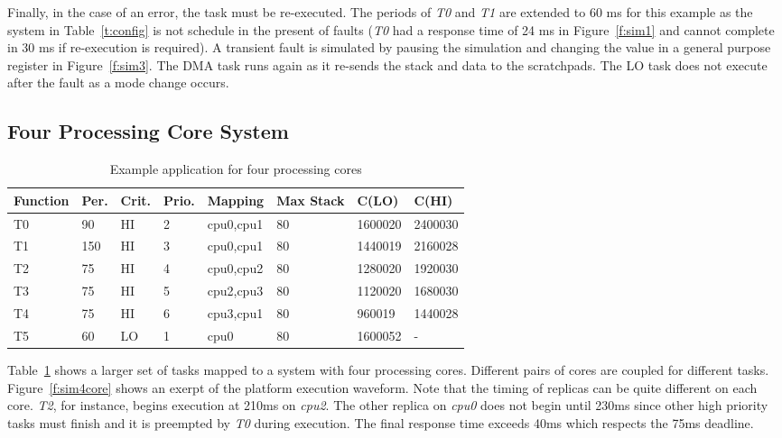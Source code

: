 	Finally, in the case of an error, the task must be re-executed. 
	The periods of \emph{T0} and \emph{T1} are extended to 60 ms for this example as the system in Table~\ref{t:config} is not schedule in the present of faults (\emph{T0} had a response time of 24 ms in Figure~\ref{f:sim1} and cannot complete in 30 ms if re-execution is required).
	A transient fault is simulated by pausing the simulation and changing the value in a general purpose register in Figure~\ref{f:sim3}. 
	The DMA task runs again as it re-sends the stack and data to the scratchpads.
	The LO task does not execute after the fault as a mode change occurs.
	
		 

\subsection{Four Processing Core System}

\begin{table}[h]
\caption{Example application for four processing cores}
\centering

	\begin{tabular}{@{}llllllll@{}}
	Function & Per. & Crit. & Prio. & Mapping & Max Stack & C(LO) & C(HI) 	 \\
	
	\toprule
	T0 & 90 & HI & 2 & cpu0,cpu1 & 80 & 1600020 & 2400030 \\
	T1 & 150 & HI & 3 & cpu0,cpu1 & 80 & 1440019 & 2160028 \\
	T2 & 75 & HI & 4 & cpu0,cpu2 & 80 & 1280020 & 1920030 \\
	T3 & 75 & HI & 5 & cpu2,cpu3 & 80 & 1120020 & 1680030 \\
	T4 & 75 & HI & 6 & cpu3,cpu1 & 80 & 960019 & 1440028 \\
	T5 & 60 & LO & 1 & cpu0 & 80 & 1600052 & - \\
	\end{tabular}

\label{t:dcc}
\end{table}

	Table~\ref{t:dcc} shows a larger set of tasks mapped to a system with four processing cores. 
	Different pairs of cores are coupled for different tasks. 
	Figure~\ref{f:sim4core} shows an exerpt of the platform execution waveform. 
	Note that the timing of replicas can be quite different on each core.
	\emph{T2}, for instance, begins execution at 210ms on \emph{cpu2}.
	The other replica on \emph{cpu0} does not begin until 230ms since other high priority tasks must finish 
	and it is preempted by \emph{T0} during execution. 
	The final response time exceeds 40ms which respects the 75ms deadline.
	
